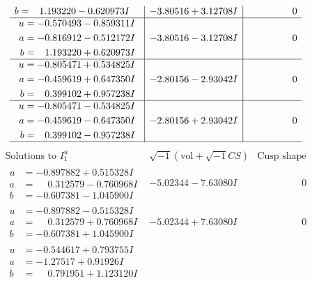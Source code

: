 \documentclass[1p]{elsarticle_modified}
\theoremstyle{definition}
\newcommand{\I}{\sqrt{-1}}
\begin{document}
$$\begin{array}{c|c|c}
\begin{aligned}
b &= \phantom{-}1.193220 - 0.620973 I\end{aligned}
 & -3.80516 + 3.12708 I & \phantom{-0.000000 } 0 \\ \hline\begin{aligned}
u &= -0.570493 - 0.859311 I \\
a &= -0.816912 - 0.512172 I \\
b &= \phantom{-}1.193220 + 0.620973 I\end{aligned}
 & -3.80516 - 3.12708 I & \phantom{-0.000000 } 0 \\ \hline\begin{aligned}
u &= -0.805471 + 0.534825 I \\
a &= -0.459619 + 0.647350 I \\
b &= \phantom{-}0.399102 + 0.957238 I\end{aligned}
 & -2.80156 - 2.93042 I & \phantom{-0.000000 } 0 \\ \hline\begin{aligned}
u &= -0.805471 - 0.534825 I \\
a &= -0.459619 - 0.647350 I \\
b &= \phantom{-}0.399102 - 0.957238 I\end{aligned}
 & -2.80156 + 2.93042 I & \phantom{-0.000000 } 0\\
 \hline 
 \end{array}$$\newpage$$\begin{array}{c|c|c}  
\text{Solutions to }I^u_{1}& \I (\text{vol} + \sqrt{-1}CS) & \text{Cusp shape}\\
 \hline 
\begin{aligned}
u &= -0.897882 + 0.515328 I \\
a &= \phantom{-}0.312579 - 0.760968 I \\
b &= -0.607381 - 1.045900 I\end{aligned}
 & -5.02344 - 7.63080 I & \phantom{-0.000000 } 0 \\ \hline\begin{aligned}
u &= -0.897882 - 0.515328 I \\
a &= \phantom{-}0.312579 + 0.760968 I \\
b &= -0.607381 + 1.045900 I\end{aligned}
 & -5.02344 + 7.63080 I & \phantom{-0.000000 } 0 \\ \hline\begin{aligned}
u &= -0.544617 + 0.793755 I \\
a &= -1.27517 + 0.91926 I \\
b &= \phantom{-}0.791951 + 1.123120 I\end{aligned}

\end{array}$$
\end{document}
